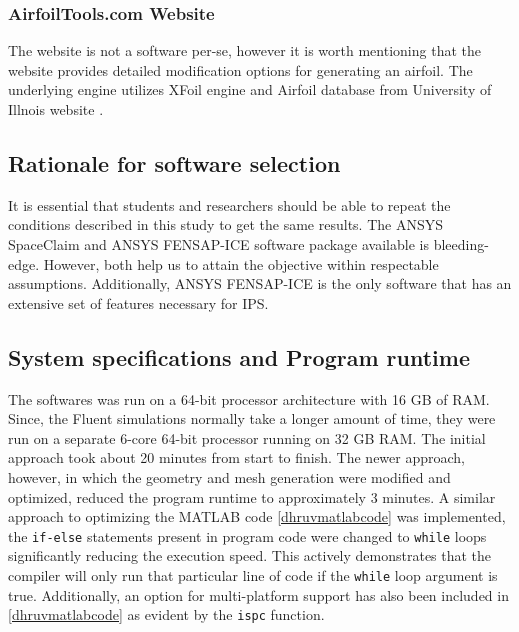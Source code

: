 \documentclass[english]{kththesis}
\begin{document}
\subsubsection {AirfoilTools.com Website} 
The website \cite{airfoiltools} is not a software per-se, however it is worth mentioning that the website provides detailed modification options for generating an airfoil. The underlying engine utilizes XFoil engine and Airfoil database from University of Illnois website \cite{uiuc}.

\subsection{Rationale for software selection} It is essential that students and researchers should be able to repeat the conditions described in this study to get the same results. The ANSYS SpaceClaim and ANSYS FENSAP-ICE software package available is bleeding-edge. However, both help us to attain the objective within respectable assumptions. Additionally, ANSYS FENSAP-ICE is the only software that has an extensive set of features necessary for IPS.


\subsection{System specifications and Program runtime} 
The softwares was run on a 64-bit processor architecture with 16 GB of RAM. Since, the Fluent simulations normally take a longer amount of time, they were run on a separate 6-core 64-bit processor running on 32 GB RAM. The initial approach took about 20 minutes from start to finish. The newer approach, however, in which the geometry and mesh generation were modified and optimized, reduced the program runtime to approximately 3 minutes. A similar approach to optimizing the MATLAB code \ref{dhruvmatlabcode} was implemented, the \lstinline{if-else} statements present in program code were changed to \lstinline{while} loops significantly reducing the execution speed. This actively demonstrates that the compiler will only run that particular line of code if the \lstinline{while} loop argument is true. Additionally, an option for multi-platform support has also been included in \ref{dhruvmatlabcode} as evident by the \lstinline{ispc} function.
\cleardoublepage
\end{document}
